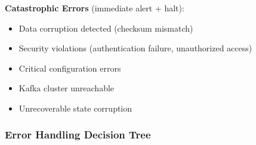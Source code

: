 \textbf{Catastrophic Errors} (immediate alert + halt):
\begin{itemize}
    \item Data corruption detected (checksum mismatch)
    \item Security violations (authentication failure, unauthorized access)
    \item Critical configuration errors
    \item Kafka cluster unreachable
    \item Unrecoverable state corruption
\end{itemize}

\subsubsection{Error Handling Decision Tree}

